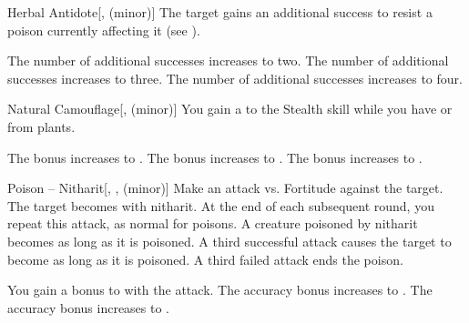 \lowercase{\hypertarget{spell:Herbal Antidote}{}}\label{spell:Herbal Antidote}
\begin{freeability}[Rank 1]{\hypertarget{spell:Herbal Antidote}{Herbal Antidote}}[,  (minor)]
The target gains an additional success to resist a poison currently affecting it (see ).

\rankline
{} The number of additional successes increases to two.
 The number of additional successes increases to three.
 The number of additional successes increases to four.
\end{freeability}
\vspace{0.25em}



\lowercase{\hypertarget{spell:Natural Camouflage}{}}\label{spell:Natural Camouflage}
\begin{freeability}[Rank 1]{\hypertarget{spell:Natural Camouflage}{Natural Camouflage}}[,  (minor)]
You gain a   to the Stealth skill while you have  or  from plants.

\rankline
{} The bonus increases to .
 The bonus increases to .
 The bonus increases to .
\end{freeability}
\vspace{0.25em}



\lowercase{\hypertarget{spell:Poison -- Nitharit}{}}\label{spell:Poison -- Nitharit}
\begin{freeability}[Rank 1]{\hypertarget{spell:Poison -- Nitharit}{Poison -- Nitharit}}[, ,  (minor)]
Make an attack vs. Fortitude against the target.
\hit The target becomes  with nitharit.
At the end of each subsequent round, you repeat this attack, as normal for poisons.
A creature poisoned by nitharit becomes  as long as it is poisoned.
A third successful attack causes the target to become  as long as it is poisoned.
A third failed attack ends the poison.

\rankline
{} You gain a  bonus to  with the attack.
 The accuracy bonus increases to .
 The accuracy bonus increases to .
\end{freeability}
\vspace{0.25em}



